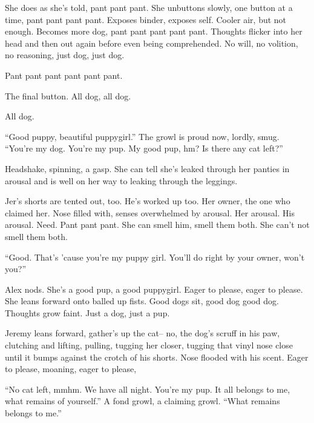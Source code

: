 She does as she's told, pant pant pant. She unbuttons slowly, one button at a time, pant pant pant pant. Exposes binder, exposes self. Cooler air, but not enough. Becomes more dog, pant pant pant pant pant. Thoughts flicker into her head and then out again before even being comprehended. No will, no volition, no reasoning, just dog, just dog.

Pant pant pant pant pant pant.

The final button. All dog, all dog.

All dog.

``Good puppy, beautiful puppygirl.'' The growl is proud now, lordly, smug. ``You're my dog. You're my pup. My good pup, hm? Is there any cat left?''

Headshake, spinning, a gasp. She can tell she's leaked through her panties in arousal and is well on her way to leaking through the leggings.

Jer's shorts are tented out, too. He's worked up too. Her owner, the one who claimed her. Nose filled with, senses overwhelmed by arousal. Her arousal. His arousal. Need. Pant pant pant. She can smell him, smell them both. She can't not smell them both.

``Good. That's 'cause you're my puppy girl. You'll do right by your owner, won't you?''

Alex nods. She's a good pup, a good puppygirl. Eager to please, eager to please. She leans forward onto balled up fists. Good dogs sit, good dog good dog. Thoughts grow faint. Just a dog, just a pup.

Jeremy leans forward, gather's up the cat-- no, the dog's scruff in his paw, clutching and lifting, pulling, tugging her closer, tugging that vinyl nose close until it bumps against the crotch of his shorts. Nose flooded with his scent. Eager to please, moaning, eager to please,

``No cat left, mmhm. We have all night. You're my pup. It all belongs to me, what remains of yourself.'' A fond growl, a claiming growl. ``What remains belongs to me.''
